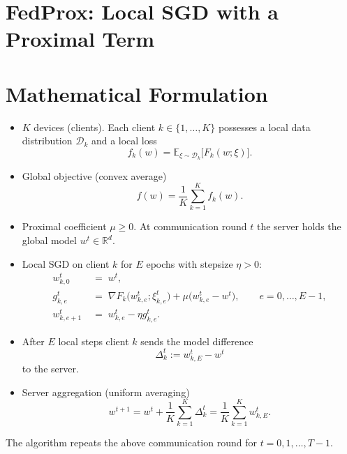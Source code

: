 \documentclass{article}
\newcommand{\EE}{\mathbb{E}}
\newcommand{\RR}{\mathbb{R}}
\begin{document}
\section*{FedProx: Local SGD with a Proximal Term}

\section*{Mathematical Formulation}
\begin{itemize}
    \item $K$ devices (clients).  Each client $k\in\{1,\dots ,K\}$ possesses a local data distribution $\mathcal D_k$ and a local loss
    \[
        f_k(w)=\EE_{\xi\sim\mathcal D_k}\!\big[F_k(w;\xi)\big].
    \]
    \item Global objective (convex average)
    \[
        f(w)=\frac1K\sum_{k=1}^K f_k(w).
    \]
    \item Proximal coefficient $\mu\ge 0$.  At communication round $t$ the server holds the global model $w^{t}\in\RR^d$.
    \item Local SGD on client $k$ for $E$ epochs with stepsize $\eta>0$:
    \[
    \begin{aligned}
        w^{t}_{k,0}&\;=\;w^{t},\\
        g^{t}_{k,e}&\;=\;\nabla F_k\!\big(w^{t}_{k,e};\xi^{t}_{k,e}\big)+\mu\big(w^{t}_{k,e}-w^{t}\big),\qquad e=0,\dots ,E-1,\\
        w^{t}_{k,e+1}&\;=\;w^{t}_{k,e}-\eta g^{t}_{k,e}.
    \end{aligned}
    \]
    \item After $E$ local steps client $k$ sends the model difference
    \[
        \Delta^{t}_k:=w^{t}_{k,E}-w^{t}
    \]
    to the server.
    \item Server aggregation (uniform averaging)
    \[
        w^{t+1}=w^{t}+\frac1K\sum_{k=1}^{K}\Delta^{t}_k
               =\frac1K\sum_{k=1}^{K} w^{t}_{k,E}.
    \]
\end{itemize}
The algorithm repeats the above communication round for $t=0,1,\dots ,T-1$.
\end{document}
